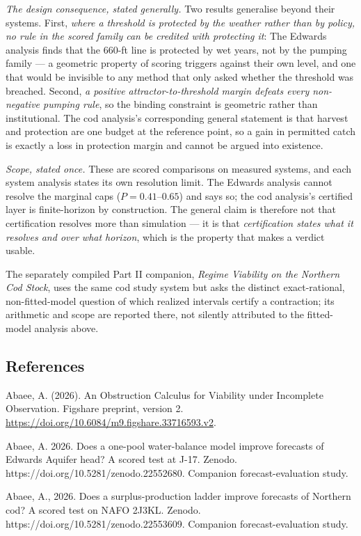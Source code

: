 \emph{The design consequence, stated generally.} Two results generalise beyond their systems. First,
\emph{where a threshold is protected by the weather rather than by policy, no rule in the scored
family can be credited with protecting it}: The Edwards analysis finds that the 660-ft line is protected by wet
years, not by the pumping family --- a geometric property of scoring triggers against their own
level, and one that would be invisible to any method that only asked whether the threshold was
breached. Second, \emph{a positive attractor-to-threshold margin defeats every non-negative pumping
rule}, so the binding constraint is geometric rather than institutional. The cod analysis's corresponding
general statement is that harvest and protection are one budget at the reference point, so a gain in
permitted catch is exactly a loss in protection margin and cannot be argued into existence.

\emph{Scope, stated once.} These are scored comparisons on measured systems, and each system analysis states
its own resolution limit. The Edwards analysis cannot resolve the marginal caps ($P = 0.41$--$0.65$) and says so;
the cod analysis's certified layer is finite-horizon by construction. The general claim is therefore not that
certification resolves more than simulation --- it is that \emph{certification states what it
resolves and over what horizon}, which is the property that makes a verdict usable.

\noindent The separately compiled Part II companion, \emph{Regime Viability on the Northern Cod Stock},
uses the same cod study system but asks the distinct exact-rational, non-fitted-model
question of which realized intervals certify a contraction; its arithmetic and scope
are reported there, not silently attributed to the fitted-model analysis above.

\subsection*{References}
\label{references}
Abaee, A. (2026). An Obstruction Calculus for Viability under Incomplete Observation. Figshare preprint, version 2. \url{https://doi.org/10.6084/m9.figshare.33716593.v2}.

Abaee, A. 2026. Does a one-pool water-balance model improve forecasts of
Edwards Aquifer head? A scored test at J-17. Zenodo.
https://doi.org/10.5281/zenodo.22552680. Companion forecast-evaluation
study.

Abaee, A., 2026. Does a surplus-production ladder improve forecasts of
Northern cod? A scored test on NAFO 2J3KL. Zenodo.
https://doi.org/10.5281/zenodo.22553609. Companion forecast-evaluation
study.

